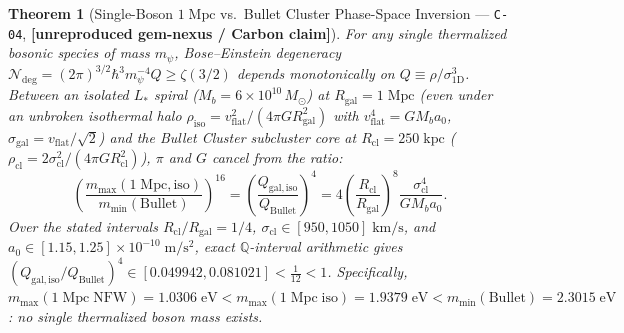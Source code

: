 \documentclass[11pt,letterpaper]{article}
\newtheorem{theorem}{Theorem}
\newcommand{\unrepro}{\textbf{\textcolor{red!60!black}{[unreproduced gem-nexus / Carbon claim]}}}
\begin{document}
\begin{theorem}[Single-Boson $1\;\mathrm{Mpc}$ vs.\ Bullet Cluster Phase-Space Inversion --- \texttt{C-04}, \unrepro]
For any single thermalized bosonic species of mass $m_\psi$, Bose--Einstein degeneracy $\mathcal{N}_{\mathrm{deg}} = (2\pi)^{3/2}\hbar^3 m_\psi^{-4} Q \ge \zeta(3/2)$ depends monotonically on $Q \equiv \rho / \sigma_{\mathrm{1D}}^3$. Between an isolated $L_*$ spiral ($M_b = 6\times 10^{10}\,M_\odot$) at $R_{\mathrm{gal}} = 1\;\mathrm{Mpc}$ (even under an unbroken isothermal halo $\rho_{\mathrm{iso}} = v_{\mathrm{flat}}^2 / (4\pi G R_{\mathrm{gal}}^2)$ with $v_{\mathrm{flat}}^4 = G M_b a_0$, $\sigma_{\mathrm{gal}} = v_{\mathrm{flat}}/\sqrt{2}$) and the Bullet Cluster subcluster core at $R_{\mathrm{cl}} = 250\;\mathrm{kpc}$ ($\rho_{\mathrm{cl}} = 2\sigma_{\mathrm{cl}}^2 / (4\pi G R_{\mathrm{cl}}^2)$), $\pi$ and $G$ cancel from the ratio:
\begin{equation}
  \left(\frac{m_{\max}(1\;\mathrm{Mpc, iso})}{m_{\min}(\mathrm{Bullet})}\right)^{16}
  = \left(\frac{Q_{\mathrm{gal,iso}}}{Q_{\mathrm{Bullet}}}\right)^4
  = 4\left(\frac{R_{\mathrm{cl}}}{R_{\mathrm{gal}}}\right)^8 \frac{\sigma_{\mathrm{cl}}^4}{G M_b a_0}.
  \label{eq:c04_identity}
\end{equation}
Over the stated intervals $R_{\mathrm{cl}}/R_{\mathrm{gal}} = 1/4$, $\sigma_{\mathrm{cl}} \in [950, 1050]\;\mathrm{km/s}$, and $a_0 \in [1.15, 1.25]\times 10^{-10}\;\mathrm{m/s^2}$, exact $\mathbb{Q}$-interval arithmetic gives $(Q_{\mathrm{gal,iso}}/Q_{\mathrm{Bullet}})^4 \in [0.049942, 0.081021] < \frac{1}{12} < 1$. Specifically, $m_{\max}(1\;\mathrm{Mpc\;NFW}) = 1.0306\;\mathrm{eV} < m_{\max}(1\;\mathrm{Mpc\;iso}) = 1.9379\;\mathrm{eV} < m_{\min}(\mathrm{Bullet}) = 2.3015\;\mathrm{eV}$: no single thermalized boson mass exists.
\end{theorem}
\end{document}
